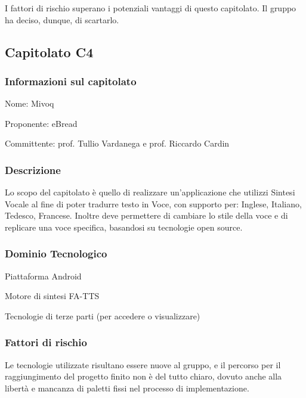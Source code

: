 I fattori di rischio superano i potenziali vantaggi di questo capitolato. Il gruppo ha deciso, dunque, di scartarlo. 

\subsection{Capitolato C4}

\subsubsection{Informazioni sul capitolato}
\begin{trivlist}
	\setlength{\itemindent}{+.3in}
	\item  Nome: Mivoq
	\item  Proponente: eBread
	\item  Committente: prof. Tullio Vardanega e prof. Riccardo Cardin
\end{trivlist}

\subsubsection{Descrizione}
Lo scopo del capitolato è quello di realizzare un'applicazione che utilizzi Sintesi Vocale al fine di poter tradurre testo in Voce, con supporto per: Inglese, Italiano, Tedesco, Francese.
Inoltre deve permettere di cambiare lo stile della voce e di replicare una voce specifica, basandosi su tecnologie open source.

\subsubsection{Dominio Tecnologico}
\begin{trivlist}
	\item  Piattaforma Android
	\item  Motore di sintesi FA-TTS
	\item  Tecnologie di terze parti (per accedere o visualizzare)
\end{trivlist}


\subsubsection{Fattori di rischio}
Le tecnologie utilizzate risultano essere nuove al gruppo, e il percorso per il raggiungimento del progetto finito non è del tutto chiaro, dovuto anche alla libertà e mancanza di paletti fissi nel processo di implementazione.

